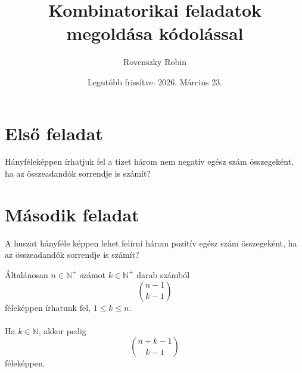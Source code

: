 \documentclass{article}
\title{Kombinatorikai feladatok megoldása kódolással}
\author{Rovenszky Robin}
\date{Legutóbb frissítve: 2026. Március 23.}
\begin{document}
\maketitle
\tableofcontents
\newpage

\section{Első feladat}
Hányféleképpen írhatjuk fel a tizet három nem negatív egész szám összegeként, ha az összeadandók sorrendje is számít?

\section{Második feladat}
A huszat hányféle képpen lehet felírni három pozitív egész szám összegeként, ha az összeadandók sorrendje is számít?

Általánosan $n \in \mathbb{N^+}$ számot $k \in \mathbb{N^+}$ darab számból 
\[
n-1 \choose k-1
\]
féleképpen írhatunk fel, $1 \le k \le n$.\\\\
Ha $k \in \mathbb{N}$, akkor pedig
\[
n + k - 1 \choose k - 1
\]
féleképpen.
\end{document}
